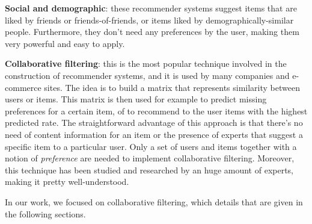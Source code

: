 \textbf{Social and demographic}: these recommender systems suggest items that are liked by friends or friends-of-friends, or items liked by demographically-similar people. Furthermore, they don’t need any preferences by the user, making them very powerful and easy to apply.

\textbf{Collaborative filtering}: this is the most popular technique involved in the construction of recommender systems, and it is used by many companies and e-commerce sites. The idea is to build a matrix that represents similarity between users or items. This matrix is then used for example to predict missing preferences for a certain item, of to recommend to the user items with the highest predicted rate. The straightforward  advantage of this approach is that there's no need of content information for an item or the presence of experts that suggest a specific item to a particular user. Only a set of users and items together with a notion of \textit{preference} are needed to implement collaborative filtering. Moreover, this technique has been studied and researched by an huge amount of experts, making it pretty well-understood.

In our work, we focused on collaborative filtering, which details that are given in the following sections. 

